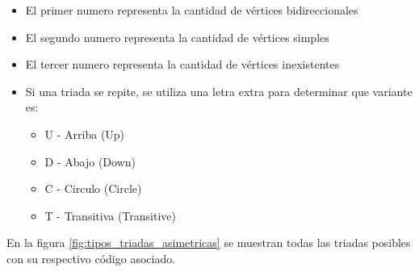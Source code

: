 \begin{itemize}
  \item El primer numero representa la cantidad de vértices bidireccionales
  \item El segundo numero representa la cantidad de vértices simples
  \item El tercer numero representa la cantidad de vértices inexistentes
  \item Si una triada se repite, se utiliza una letra extra para determinar que variante es:
  \begin{itemize}
    \item U - Arriba (Up)
    \item D - Abajo (Down)
    \item C - Circulo (Circle)
    \item T - Transitiva (Transitive)
  \end{itemize}
\end{itemize}

En la figura \ref{fig:tipos_triadas_asimetricas} se muestran todas las triadas posibles con su respectivo código asociado.

